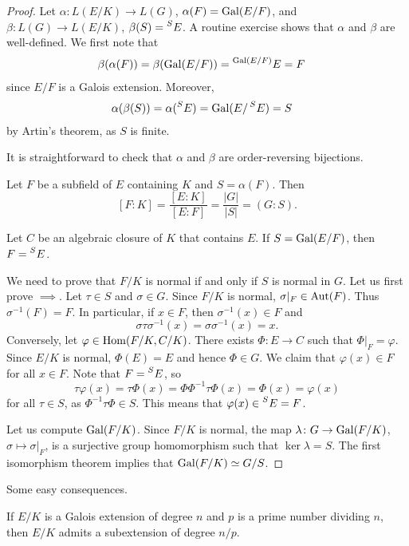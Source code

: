 \begin{proof}
Let $\alpha\colon L(E/K)\to L(G)$, $\alpha(F)=\operatorname{Gal}(E/F)$, and $\beta\colon L(G)\to L(E/K)$, 
$\beta(S)=\prescript{S}{}{E}$. A routine
exercise shows that $\alpha$ and $\beta$ are well-defined. 
We first note that
\begin{align*}
   &\beta(\alpha(F))=\beta(\operatorname{Gal}(E/F))=\prescript{\operatorname{Gal}(E/F)}{}{E}=F
\end{align*}
since $E/F$ is a Galois extension. Moreover,
\begin{align*}
   &\alpha(\beta(S))=\alpha(\prescript{S}{}{E})=\operatorname{Gal}(E/\prescript{S}{}{E})=S
\end{align*}
by Artin's theorem, as $S$ is finite. 

It is straightforward to check that $\alpha$ and $\beta$ are order-reversing bijections. 

Let $F$ be a subfield of $E$ containing $K$ and 
$S=\alpha(F)$. Then
\[
[F:K]=\frac{[E:K]}{[E:F]}=\frac{|G|}{|S|}=(G:S).
\]

Let $C$ be an algebraic closure of $K$ that contains $E$. 
If $S=\operatorname{Gal}(E/F)$, then $F=\prescript{S}{}{E}$. 

We need to prove that $F/K$ is normal if and only if $S$ is normal in $G$. 
Let us first prove $\implies$. Let $\tau\in S$ and $\sigma\in G$. Since
$F/K$ is normal, $\sigma|_F\in\operatorname{Aut}(F)$. Thus $\sigma^{-1}(F)=F$. In particular, 
if $x\in F$, then $\sigma^{-1}(x)\in F$ and 
\[
\sigma\tau\sigma^{-1}(x)=\sigma\sigma^{-1}(x)=x.
\]
Conversely, let $\varphi\in\operatorname{Hom}(F/K,C/K)$. There exists 
$\Phi\colon E\to C$ such that $\Phi|_F=\varphi$. Since $E/K$ is normal, 
$\Phi(E)=E$ and hence $\Phi\in G$. We claim that $\varphi(x)\in F$ for all $x\in F$. 
Note that $F=\prescript{S}{}{E}$, so
 \[
 \tau\varphi(x)=\tau\Phi(x)=\Phi\Phi^{-1}\tau\Phi(x)=\Phi(x)=\varphi(x)
 \]
 for all $\tau\in S$, as $\Phi^{-1}\tau\Phi\in S$. This means that $\varphi(x)\in\prescript{S}{}{E}=F$. 
 
 Let us compute $\operatorname{Gal}(F/K)$. Since $F/K$ is normal, 
 the map 
 $\lambda\colon G\to\operatorname{Gal}(F/K)$, $\sigma\mapsto\sigma|_F$, 
 is a surjective group homomorphism such that $\ker\lambda=S$. The first isomorphism 
 theorem implies that $\operatorname{Gal}(F/K)\simeq G/S$. 
\end{proof}

Some easy consequences.

\begin{exercise}
\label{xca:Cauchy+Galois}
    If $E/K$ is a Galois extension of degree $n$ and
    $p$ is a prime number dividing $n$, then $E/K$ admits
    a subextension of degree $n/p$. 
\end{exercise}
    
